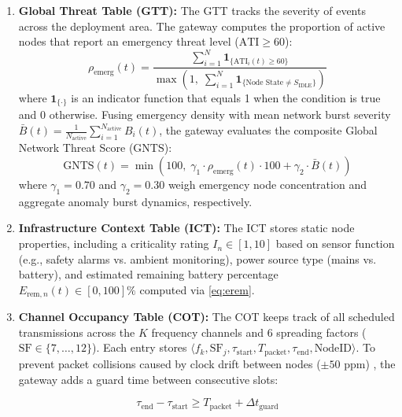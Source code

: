 \documentclass[preprint,review,12pt]{elsarticle}
\begin{document}
\begin{enumerate}
    \item \textbf{Global Threat Table (GTT):} The GTT tracks the severity of events across the deployment area. The gateway computes the proportion of active nodes that report an emergency threat level ($\text{ATI} \ge 60$):
    \begin{equation}
    \label{eq:threat_density}
    \rho_{\text{emerg}}(t) = \frac{\sum_{i=1}^N \mathbf{1}_{\{\text{ATI}_i(t) \ge 60\}}}{\max\left(1, \; \sum_{i=1}^N \mathbf{1}_{\{\text{Node State} \ne S_{\text{IDLE}}\}}\right)}
    \end{equation}
    where $\mathbf{1}_{\{\cdot\}}$ is an indicator function that equals 1 when the condition is true and 0 otherwise. Fusing emergency density with mean network burst severity $\bar{B}(t) = \frac{1}{N_{\text{active}}} \sum_{i=1}^{N_{\text{active}}} B_i(t)$, the gateway evaluates the composite Global Network Threat Score ($\text{GNTS}$):
    \begin{equation}
    \label{eq:gnts_formula}
    \text{GNTS}(t) = \min\left(100, \; \gamma_1 \cdot \rho_{\text{emerg}}(t) \cdot 100 + \gamma_2 \cdot \bar{B}(t)\right)
    \end{equation}
    where $\gamma_1 = 0.70$ and $\gamma_2 = 0.30$ weigh emergency node concentration and aggregate anomaly burst dynamics, respectively.

    \item \textbf{Infrastructure Context Table (ICT):} The ICT stores static node properties, including a criticality rating $I_n \in [1, 10]$ based on sensor function (e.g., safety alarms vs. ambient monitoring), power source type (mains vs. battery), and estimated remaining battery percentage $E_{\text{rem}, n}(t) \in [0, 100]\%$ computed via \eqref{eq:erem}.

    \item \textbf{Channel Occupancy Table (COT):} The COT keeps track of all scheduled transmissions across the $K$ frequency channels and 6 spreading factors ($\text{SF} \in \{7, \dots, 12\}$). Each entry stores $\langle f_k, \text{SF}_j, \tau_{\text{start}}, T_{\text{packet}}, \tau_{\text{end}}, \text{NodeID} \rangle$. To prevent packet collisions caused by clock drift between nodes ($\pm 50\text{ ppm}$) \cite{polonelli2019slotted, sahoo2025lorahart}, the gateway adds a guard time between consecutive slots:

    \begin{equation}

    \label{eq:cot_guard}

    \tau_{\text{end}} - \tau_{\text{start}} \ge T_{\text{packet}} + \Delta t_{\text{guard}}


\end{equation}
\end{enumerate}
\end{document}
